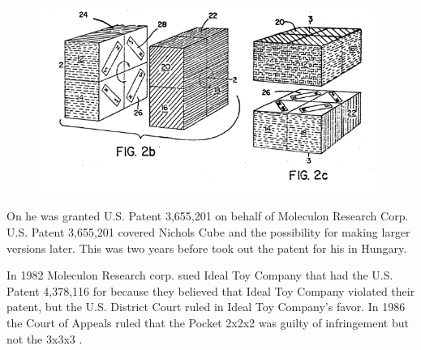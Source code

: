 \begin{figure}[htb]
	\centering
		\includegraphics[scale=0.6]{input/pics/Nicholspatent2.png}
	\caption{}
	\label{fig:Nicholspatent2}
\end{figure}

On  he was granted U.S. Patent 3,655,201 on behalf of Moleculon Research Corp. U.S. Patent 3,655,201 covered Nichols Cube and the possibility for making larger versions later. 
This was two years before \erno{} took out the patent for his \rubik{} in Hungary. 

In 1982 Moleculon Research corp. sued Ideal Toy Company that had the U.S. Patent 4,378,116 for \rubik{} because they believed that Ideal Toy Company violated their patent, but the U.S. District Court ruled in Ideal Toy Company's favor. In 1986 the Court of Appeals ruled that the Pocket \rubik{} 2x2x2 was guilty of infringement but not the 3x3x3 \rubik{}. 

%